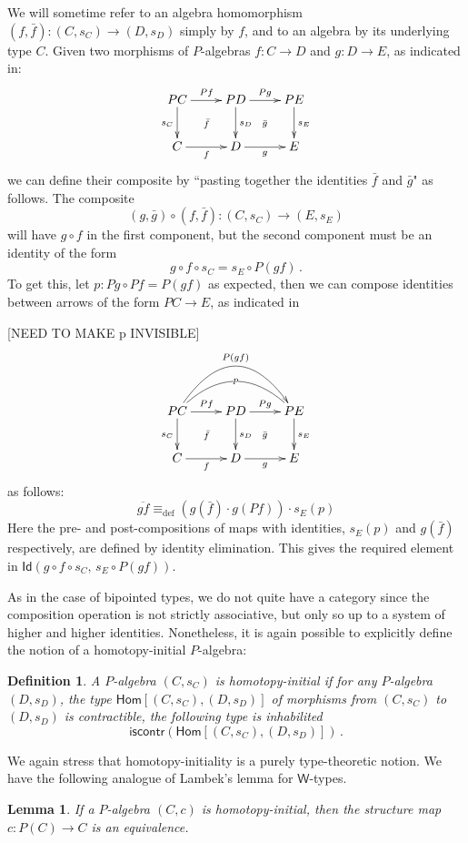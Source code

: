 \documentclass[reqno,10pt,a4paper,oneside]{amsart}
\numberwithin{equation}{section}
\theoremstyle{mythm}
\newtheorem{lemma}[theorem]{Lemma}
\theoremstyle{mydef}
\newtheorem{definition}[theorem]{Definition}
\theoremstyle{myrmk}
\newcommand{\ie}{\text{i.e.\ }}
\newcommand{\deq}{\equiv}
\newcommand{\defeq}{\deq_{\mathrm{def}}}
\newcommand{\co}{\colon}
\newcommand{\iscontr}{\mathsf{iscontr}}
\newcommand{\Id}{\mathsf{Id}}
\newcommand{\W}{\mathsf{W}}
\newcommand{\Hom}{\mathsf{Hom}}
\begin{document}
We will sometime refer to an algebra homomorphism $(f, \bar{f}) : (C, s_C) \rightarrow (D, s_D)$ simply by $f$, and to an algebra by its underlying type $C$.
Given two morphisms of $P$-algebras $f \co C \to D$ and $g \co D \to E$, as indicated in:
\[
\xymatrix{
 PC \ar[d]_{s_C} \ar[r]^{Pf}  \ar@{}[dr]|{\bar{f}} &  PD \ar[d]^{s_D}  \ar[r]^{Pg}  \ar@{}[dr]|{\bar{g}} &  PE \ar[d]^{s_E} \\
C \ar[r]_{f}   & D \ar[r]_{g}   & E }
\]
we can define their composite by ``pasting together the identities $\bar{f}$ and $\bar{g}$" as follows.
The composite $$(g, \bar{g}) \circ (f, \bar{f}) \co (C,s_C) \to (E,s_E)$$ will have $g\circ f$ in the first component, but the second component must be an identity of the form
\[
g\circ f\circ s_C = s_E\circ P(gf)\, .
\]
To get this, let $p : Pg\circ Pf = P(gf)$ as expected, then we can compose identities between arrows of the form $PC \to E$, as indicated in

[NEED TO MAKE p INVISIBLE]
\[
\xymatrix{
 PC \ar[d]_{s_C} \ar[r]^{Pf}  \ar@{}[dr]|{\bar{f}} \ar@{}@/^2pc/[rr]|{p} \ar@/^3pc/[rr]^{P(gf)} &  PD \ar[d]^{s_D}  \ar[r]^{Pg}  \ar@{}[dr]|{\bar{g}} &  PE \ar[d]^{s_E} \\
C \ar[r]_{f}   & D \ar[r]_{g}   & E }
\]
as follows:
\[
\overline{gf} \defeq (g(\bar{f})\cdot g(Pf))\cdot s_E(p)
\]
Here the pre- and post-compositions of maps with identities, $s_E(p)$ and $g(\bar{f})$ respectively, are defined by identity elimination.
This gives the required  element in $\Id(g\circ f\circ s_C ,\, s_E\circ P(gf))$.

As in the case of bipointed types, we do not quite have a category since the composition operation is not strictly associative, but only so up to a system of higher and higher identities. 
Nonetheless, it is again possible to explicitly define the notion of a homotopy-initial $P$-algebra:

\begin{definition}\label{def:AlgInit}
A $P$-algebra $(C, s_C)$ is  \emph{homotopy-initial}  if for any $P$-algebra $(D,s_D)$, the type $\Hom[(C, s_C),(D,s_D)]$ of morphisms from $(C, s_C)$ to $(D,s_D)$
is contractible, \ie the following type is inhabilited
\[
 \iscontr(\Hom[(C, s_C),(D,s_D)]) \, .
\]  
\end{definition}

We again stress that homotopy-initiality is a purely type-theoretic notion. We have the following analogue of Lambek's lemma for $\W$-types.


\begin{lemma}\label{lem:IntLambek}
If a $P$-algebra $(C,c)$ is homotopy-initial, then the structure map $c \co P(C) \to C$ is an equivalence.
\end{lemma}
\end{document}

